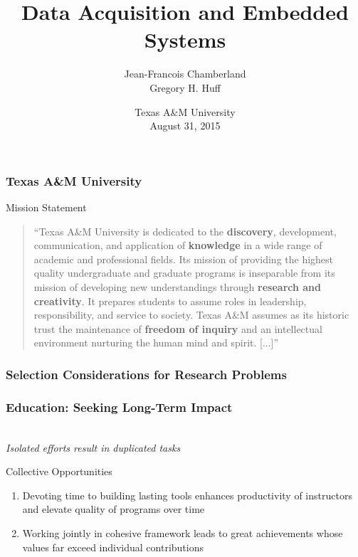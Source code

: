 \documentclass{beamer}
\title{Data Acquisition and Embedded Systems}
\author{Jean-Francois Chamberland\\
Gregory H. Huff}
\institute{Electrical and Computer Engineering}
\date{Texas A\&M University\\ August 31, 2015}
\begin{document}
\begin{frame}
  \titlepage
\end{frame}

\begin{frame}
\frametitle{\textcolor{tamu}{Texas A{\&}M University}}

\begin{block}{\textcolor{tamu}{Mission Statement}}
\begin{footnotesize}
\begin{quotation}
\noindent
``Texas A{\&}M University is dedicated to the \textbf{discovery}, development, communication, and application of \textbf{knowledge} in a wide range of academic and professional fields.
Its mission of providing the highest quality undergraduate and graduate programs is inseparable from its mission of developing new understandings through \textbf{research and creativity}.
It prepares students to assume roles in leadership, responsibility, and service to society.
Texas A{\&}M assumes as its historic trust the maintenance of \textbf{freedom of inquiry} and an intellectual environment nurturing the human mind and spirit.
[...]''
\end{quotation}
\end{footnotesize}
\end{block}
\end{frame}

\begin{frame}
\frametitle{\textcolor{tamu}{Selection Considerations for Research Problems}}

  \begin{center}
  \scalebox{0.65}{}
  \end{center}
\end{frame}

\begin{frame}
  \frametitle{Education: Seeking Long-Term Impact}

  \begin{center}
  \scalebox{0.5}{} \\
  \emph{Isolated efforts result in duplicated tasks}
  \end{center}
  \begin{block}{Collective Opportunities}
    \begin{enumerate}
    \item Devoting time to building lasting tools enhances productivity of instructors and elevate quality of programs over time
    \item Working jointly in cohesive framework leads to great achievements whose values far exceed individual contributions
    \end{enumerate}
  \end{block}
\end{frame}
\end{document}

